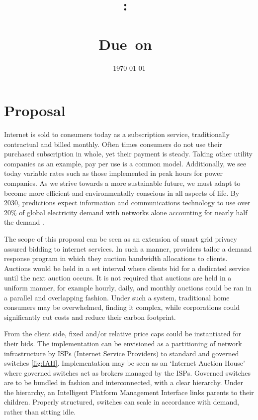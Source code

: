 \documentclass{article}
\title{
    \vspace{2in}
    \textmd{\textbf{\hmwkClass:\ \\ \hmwkTitle}}\\
    \normalsize\vspace{0.1in}\small{Due\ on\ \hmwkDueDate}\\
    \vspace{0.1in}\Large{\textit{\paprTitle}}
    \vspace{3in}
}
\author{\hmwkAuthorName}
\date{\today}
\begin{document}
\maketitle

\pagebreak

\newpage


\section{Proposal}
Internet is sold to consumers today as a subscription service, traditionally contractual and billed monthly. 
Often times consumers do not use their purchased subscription in whole, yet their payment is steady. 
Taking other utility companies as an example, pay per use is a common model. 
Additionally, we see today variable rates such as those implemented in peak hours for power companies. 
As we strive towards a more sustainable future, we must adapt to become more efficient and environmentally conscious in all aspects of life. 
By 2030, predictions expect information and communications technology to use over 20\% of global electricity demand with networks alone accounting for nearly half the demand \cite{Jones_2018}.

The scope of this proposal can be seen as an extension of smart grid privacy assured bidding \cite{7812774} to internet services.
In such a manner, providers tailor a demand response program in which they auction bandwidth allocations to clients. 
Auctions would be held in a set interval where clients bid for a dedicated service until the next auction occurs. 
It is not required that auctions are held in a uniform manner, for example hourly, daily, and monthly auctions could be ran in a parallel and overlapping fashion. 
Under such a system, traditional home consumers may be overwhelmed, finding it complex, while corporations could significantly cut costs and reduce their carbon footprint. 

From the client side, fixed and/or relative price caps could be instantiated for their bids.
The implementation can be envisioned as a partitioning of network infrastructure by ISPs (Internet Service Providers) to standard and governed switches \ref{fig:IAH}.
Implementation may be seen as an `Internet Auction House' where governed switches act as brokers managed by the ISPs.
Governed switches are to be bundled in fashion and interconnected, with a clear hierarchy. 
Under the hierarchy, an Intelligent Platform Management Interface links parents to their children.
Properly structured, switches can scale in accordance with demand, rather than sitting idle. 
\end{document}

